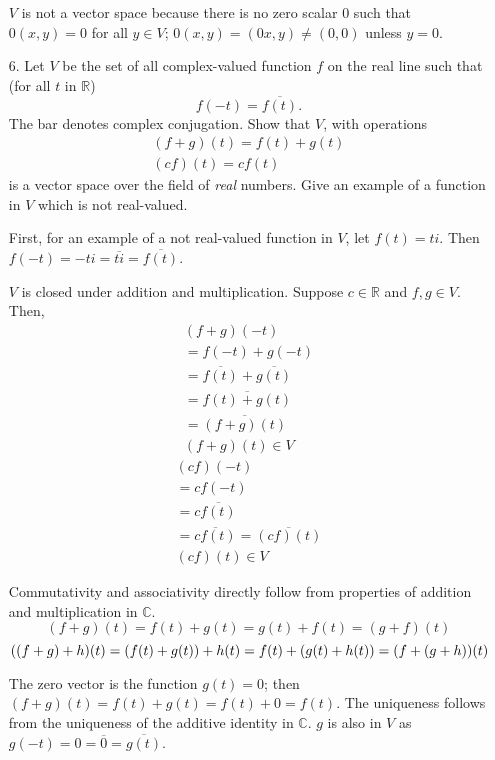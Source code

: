 \documentclass{article}
\begin{document}
\begin{enumerate}[listparindent=\parindent]
\(V\) is not a vector space because there is no zero scalar \(0\) such that \(0(x, y) = 0\) for all \(y \in V\);
\(0(x, y) = (0x, y) \neq (0, 0)\) unless \(y = 0\).

\item[6.] Let \(V\) be the set of all complex-valued function \(f\) on the real line such that (for all \(t\) in \(\mathbb{R}\))
    \[f(-t) = \overline{f(t)}.\]
    The bar denotes complex conjugation. Show that \(V\), with operations
    \begin{gather*}
        (f + g)(t) = f(t) + g(t) \\
        (cf)(t) = cf(t)
    \end{gather*}
    is a vector space over the field of \textit{real} numbers. Give an example of a function in \(V\) which is not real-valued.

    First, for an example of a not real-valued function in \(V\), let \(f(t) = ti\). Then \(f(-t) = -ti = \overline{ti} = \overline{f(t)}\).

    \(V\) is closed under addition and multiplication. Suppose \(c \in \mathbb {R}\) and \(f, g \in V\). Then,
    \begin{gather*}
        (f + g)(-t) \\
        = f(-t) + g(-t) \\
        = \overline{f(t)} + \overline{g(t)} \\
        = \overline{f(t) + g(t)} \\
        = \overline{(f + g)(t)} \\
        (f + g)(t) \in V
    \end{gather*}
    \begin{gather*}
        (cf)(-t) \\
        = cf(-t) \\
        = c\overline{f(t)} \\
        = \overline{cf(t)}
        = \overline{(cf)(t)} \\
        (cf)(t) \in V
    \end{gather*}

    Commutativity and associativity directly follow from properties of addition and multiplication in \(\mathbb{C}\).
    \[(f + g)(t) = f(t) + g(t) = g(t) + f(t) = (g + f)(t)\]
    \[((f + g) + h)(t) = (f(t) + g(t)) + h(t) = \\ f(t) + (g(t) + h(t)) = (f + (g + h))(t)\]

    The zero vector is the function \(g(t) = 0\); then \((f + g)(t) = f(t) + g(t) = f(t) + 0 = f(t)\).
    The uniqueness follows from the uniqueness of the additive identity in \(\mathbb{C}\).
    \(g\) is also in \(V\) as \(g(-t) = 0 = \overline{0} = \overline{g(t)}\).


\end{enumerate}
\end{document}
